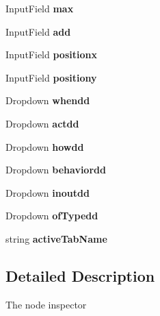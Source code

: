 \begin{DoxyCompactItemize}
Input\+Field {\bfseries max}
\item 
\mbox{\label{class_node_inspector_ae969c1cf7237b1ceb4315169c7b4d60d}} 
Input\+Field {\bfseries add}
\item 
\mbox{\label{class_node_inspector_a21c482f182e545d7704c38f2fb489c29}} 
Input\+Field {\bfseries positionx}
\item 
\mbox{\label{class_node_inspector_ae6cc2edfe5015761e34a2b8caa662ec7}} 
Input\+Field {\bfseries positiony}
\item 
\mbox{\label{class_node_inspector_aa074f71f1f890c09ba823eda0c608523}} 
Dropdown {\bfseries whendd}
\item 
\mbox{\label{class_node_inspector_ada4f256c5deb0acda36e18f0b4c27137}} 
Dropdown {\bfseries actdd}
\item 
\mbox{\label{class_node_inspector_ae02587c2ce15aea863916cd9db10767b}} 
Dropdown {\bfseries howdd}
\item 
\mbox{\label{class_node_inspector_aaad59cf9222edab92590757567b2f893}} 
Dropdown {\bfseries behaviordd}
\item 
\mbox{\label{class_node_inspector_a3c57564ec2eb96805ab76844f1d7b1be}} 
Dropdown {\bfseries inoutdd}
\item 
\mbox{\label{class_node_inspector_a69f86146243d61986410aaa6dd3c106b}} 
Dropdown {\bfseries of\+Typedd}
\item 
\mbox{\label{class_node_inspector_a68b3699c849226225b67993b588792c1}} 
string {\bfseries active\+Tab\+Name}
\end{DoxyCompactItemize}


\subsection{Detailed Description}
The node inspector 



